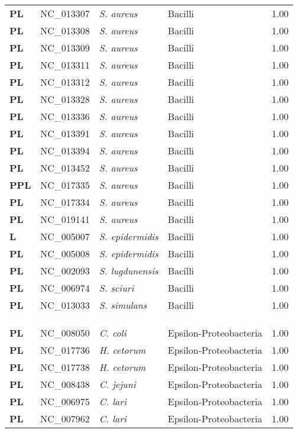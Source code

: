 \begin{adjustwidth}{-3cm}{2cm}
{\begin{supertabular}{>{\bfseries}l|p{0.1\textwidth}p{0.14\textwidth}l|l}
PL & NC\_013307 & \textit{S. aureus} & Bacilli & 1.00\\
PL & NC\_013308 & \textit{S. aureus} & Bacilli & 1.00\\
PL & NC\_013309 & \textit{S. aureus} & Bacilli & 1.00\\
PL & NC\_013311 & \textit{S. aureus} & Bacilli & 1.00\\
PL & NC\_013312 & \textit{S. aureus} & Bacilli & 1.00\\
PL & NC\_013328 & \textit{S. aureus} & Bacilli & 1.00\\
PL & NC\_013336 & \textit{S. aureus} & Bacilli & 1.00\\
PL & NC\_013391 & \textit{S. aureus} & Bacilli & 1.00\\
PL & NC\_013394 & \textit{S. aureus} & Bacilli & 1.00\\
PL & NC\_013452 & \textit{S. aureus} & Bacilli & 1.00\\
PPL & NC\_017335 & \textit{S. aureus} & Bacilli & 1.00\\
PL & NC\_017334 & \textit{S. aureus} & Bacilli & 1.00\\
PL & NC\_019141 & \textit{S. aureus} & Bacilli & 1.00\\
L & NC\_005007 & \textit{S. epidermidis} & Bacilli & 1.00\\
PL & NC\_005008 & \textit{S. epidermidis} & Bacilli & 1.00\\
PL & NC\_002093 & \textit{S. lugdunensis} & Bacilli & 1.00\\
PL & NC\_006974 & \textit{S. sciuri} & Bacilli & 1.00\\
PL & NC\_013033 & \textit{S. simulans} & Bacilli & 1.00\\
\\
\\
\hline\\
PL & NC\_008050 & \textit{C. coli} & Epsilon-Proteobacteria & 1.00\\
PL & NC\_017736 & \textit{H. cetorum} & Epsilon-Proteobacteria & 1.00\\
PL & NC\_017738 & \textit{H. cetorum} & Epsilon-Proteobacteria & 1.00\\
PL & NC\_008438 & \textit{C. jejuni} & Epsilon-Proteobacteria & 1.00\\
PL & NC\_006975 & \textit{C. lari} & Epsilon-Proteobacteria & 1.00\\
PL & NC\_007962 & \textit{C. lari} & Epsilon-Proteobacteria & 1.00\\

\end{supertabular}}
\end{adjustwidth}
